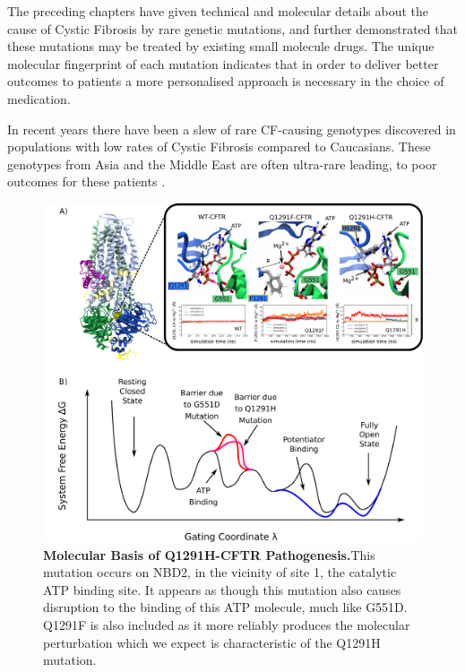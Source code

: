 The preceding chapters have given technical and molecular details about the cause of Cystic Fibrosis by rare genetic mutations, and further demonstrated that these mutations may be treated by existing small molecule drugs. The unique molecular fingerprint of each mutation indicates that in order to deliver better outcomes to patients a more personalised approach is necessary in the choice of medication. 



In recent years there have been a slew of rare CF-causing genotypes discovered in populations with low rates of Cystic Fibrosis compared to Caucasians. These genotypes from Asia and the Middle East are often ultra-rare leading, to poor outcomes for these patients \cite{}. 



\begin{figure}
	\begin{center}
		\includegraphics[width=\textwidth]{figures/perspective/Q1291.pdf}
	\end{center}
	\captionsetup{singlelinecheck = false, justification=raggedright}
	\caption[Molecular Basis of Q1291H-CFTR Pathogenesis]{\textbf{Molecular Basis of Q1291H-CFTR Pathogenesis.}{This mutation occurs on NBD2, in the vicinity of site 1, the catalytic ATP binding site. It appears as though this mutation also causes disruption to the binding of this ATP molecule, much like G551D. Q1291F is also included as it more reliably produces the molecular perturbation which we expect is characteristic of the Q1291H mutation. }}

\end{figure}


